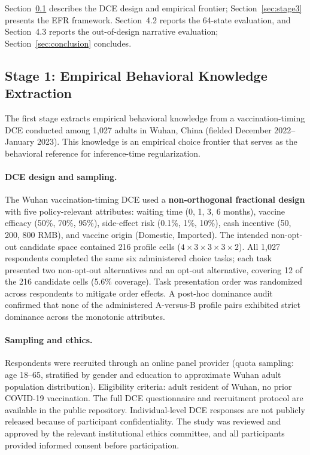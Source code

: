 \documentclass[12pt]{article}
\begin{document}
Section~\ref{sec:stage1} describes the DCE design and empirical frontier; Section~\ref{sec:stage3} presents the EFR framework. Section~4.2 reports the 64-state evaluation, and Section~4.3 reports the out-of-design narrative evaluation; Section~\ref{sec:conclusion} concludes.

\subsection{Stage 1: Empirical Behavioral Knowledge Extraction}
\label{sec:stage1}

The first stage extracts empirical behavioral knowledge from a vaccination-timing DCE conducted among 1,027 adults in Wuhan, China (fielded December 2022--January 2023). This knowledge is an empirical choice frontier that serves as the behavioral reference for inference-time regularization.

\paragraph{DCE design and sampling.}

The Wuhan vaccination-timing DCE used a \textbf{non-orthogonal fractional design} with five policy-relevant attributes: waiting time (0, 1, 3, 6 months), vaccine efficacy (50\%, 70\%, 95\%), side-effect risk (0.1\%, 1\%, 10\%), cash incentive (50, 200, 800 RMB), and vaccine origin (Domestic, Imported). The intended non-opt-out candidate space contained 216 profile cells ($4 \times 3 \times 3 \times 3 \times 2$). All 1,027 respondents completed the same six administered choice tasks; each task presented two non-opt-out alternatives and an opt-out alternative, covering 12 of the 216 candidate cells (5.6\% coverage). Task presentation order was randomized across respondents to mitigate order effects. A post-hoc dominance audit confirmed that none of the administered A-versus-B profile pairs exhibited strict dominance across the monotonic attributes.

\paragraph{Sampling and ethics.}

Respondents were recruited through an online panel provider (quota sampling: age 18--65, stratified by gender and education to approximate Wuhan adult population distribution). Eligibility criteria: adult resident of Wuhan, no prior COVID-19 vaccination. The full DCE questionnaire and recruitment protocol are available in the public repository. Individual-level DCE responses are not publicly released because of participant confidentiality. The study was reviewed and approved by the relevant institutional ethics committee, and all participants provided informed consent before participation.
\end{document}
